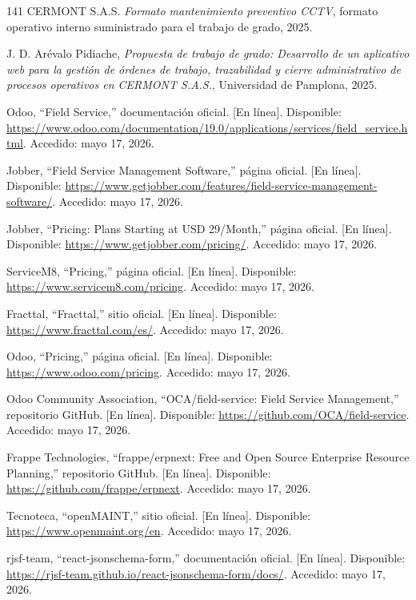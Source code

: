 \begin{thebibliography}{141}
CERMONT S.A.S. \textit{Formato mantenimiento preventivo CCTV}, formato operativo interno suministrado para el trabajo de grado, 2025.

J. D. Arévalo Pidiache, \textit{Propuesta de trabajo de grado: Desarrollo de un aplicativo web para la gestión de órdenes de trabajo, trazabilidad y cierre administrativo de procesos operativos en CERMONT S.A.S.}, Universidad de Pamplona, 2025.

Odoo, ``Field Service,'' documentación oficial. [En línea]. Disponible: \url{https://www.odoo.com/documentation/19.0/applications/services/field_service.html}. Accedido: mayo 17, 2026.

Jobber, ``Field Service Management Software,'' página oficial. [En línea]. Disponible: \url{https://www.getjobber.com/features/field-service-management-software/}. Accedido: mayo 17, 2026.

Jobber, ``Pricing: Plans Starting at USD 29/Month,'' página oficial. [En línea]. Disponible: \url{https://www.getjobber.com/pricing/}. Accedido: mayo 17, 2026.

ServiceM8, ``Pricing,'' página oficial. [En línea]. Disponible: \url{https://www.servicem8.com/pricing}. Accedido: mayo 17, 2026.

Fracttal, ``Fracttal,'' sitio oficial. [En línea]. Disponible: \url{https://www.fracttal.com/es/}. Accedido: mayo 17, 2026.

Odoo, ``Pricing,'' página oficial. [En línea]. Disponible: \url{https://www.odoo.com/pricing}. Accedido: mayo 17, 2026.

Odoo Community Association, ``OCA/field-service: Field Service Management,'' repositorio GitHub. [En línea]. Disponible: \url{https://github.com/OCA/field-service}. Accedido: mayo 17, 2026.

Frappe Technologies, ``frappe/erpnext: Free and Open Source Enterprise Resource Planning,'' repositorio GitHub. [En línea]. Disponible: \url{https://github.com/frappe/erpnext}. Accedido: mayo 17, 2026.

Tecnoteca, ``openMAINT,'' sitio oficial. [En línea]. Disponible: \url{https://www.openmaint.org/en}. Accedido: mayo 17, 2026.

rjsf-team, ``react-jsonschema-form,'' documentación oficial. [En línea]. Disponible: \url{https://rjsf-team.github.io/react-jsonschema-form/docs/}. Accedido: mayo 17, 2026.


\end{thebibliography}
